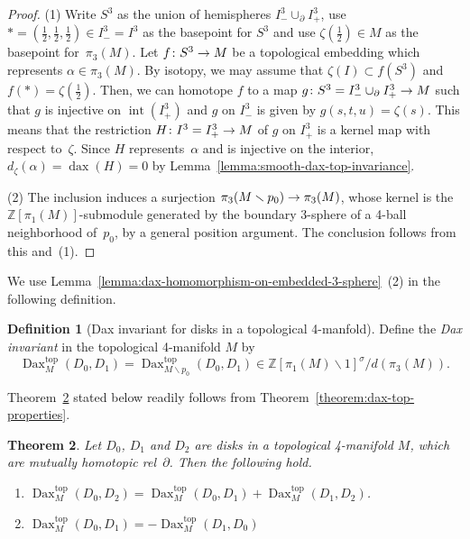 \documentclass[11pt]{amsart}
\def\to{\mathchoice{\longrightarrow}{\rightarrow}{\rightarrow}{\rightarrow}}
\newtheorem{theorem}{Theorem}[section]
\theoremstyle{definition}
\newtheorem{definition}[theorem]{Definition}
\theoremstyle{theorem-giventitle}
\theoremstyle{definition-giventitle}
\numberwithin{equation}{section}
\def\Z{\mathbb{Z}}
\def\inte{\operatorname{int}}
\def\top{\mathrm{top}}
\def\dax{\operatorname{dax}}
\def\Dax{\operatorname{Dax}}
\def\setminus{\smallsetminus}
\begin{document}
\begin{proof}
  (1) Write $S^3$ as the union of hemispheres $I^3_- \cup_\partial I^3_+$, use $*=(\frac12,\frac12,\frac12)\in I^3_- = I^3$ as the basepoint for $S^3$ and use $\zeta(\frac12)\in M$ as the basepoint for~$\pi_3(M)$.
  Let $f\colon S^3\to M$ be a topological embedding which represents $\alpha\in \pi_3(M)$.
  By isotopy, we may assume that $\zeta(I) \subset f(S^3)$ and $f(*) = \zeta(\frac12)$.
  Then, we can homotope $f$ to a map $g\colon S^3=I^3_- \cup_\partial I^3_+ \to M$ such that $g$ is injective on $\inte(I^3_+)$ and $g$ on ${I^3_-}$ is given by $g(s,t,u)=\zeta(s)$.
  This means that the restriction $H\colon I^3 = I^3_+ \to M$ of $g$ on $I^3_+$ is a kernel map with respect to~$\zeta$.
  Since $H$ represents~$\alpha$ and is injective on the interior, $d_\zeta(\alpha)=\dax(H)=0$ by Lemma~\ref{lemma:smooth-dax-top-invariance}.

  (2) The inclusion induces a surjection $\pi_3(M\setminus p_0)\to \pi_3(M)$, whose kernel is the $\Z[\pi_1(M)]$-submodule generated by the boundary 3-sphere of a 4-ball neighborhood of~$p_0$, by a general position argument.
  The conclusion follows from this and~(1).
\end{proof}

We use Lemma~\ref{lemma:dax-homomorphism-on-embedded-3-sphere}~(2) in the following definition.

\begin{definition}[Dax invariant for disks in a topological 4-manfold]
  \label{definition:dax-in-top-4-manifold}
  Define the \emph{Dax invariant} in the topological 4-manifold $M$ by
  \[
    \Dax^\top_M(D_0,D_1)=\Dax^\top_{M\setminus p_0}(D_0,D_1) \in \Z[\pi_1(M)\setminus 1]^\sigma / d(\pi_3(M)).
  \]
\end{definition}

Theorem~\ref{theorem:dax-in-top-4-manifold-properties} stated below readily follows from Theorem~\ref{theorem:dax-top-properties}.

\begin{theorem}
  \label{theorem:dax-in-top-4-manifold-properties}
  Let $D_0$, $D_1$ and $D_2$ are disks in a topological 4-manifold $M$, which are mutually homotopic rel~$\partial$.
  Then the following hold.
  \begin{enumerate}
    \item\label{item:dax-in-top-4-manifold-additivity} $\Dax^\top_M(D_0,D_2) = \Dax^\top_M(D_0,D_1) + \Dax^\top_M(D_1,D_2)$.
    \item\label{item:dax-in-top-4-manifold-inverse} $\Dax^\top_M(D_0,D_1) = -\Dax^\top_M(D_1,D_0)$
  \end{enumerate}
\end{theorem}
\end{document}
